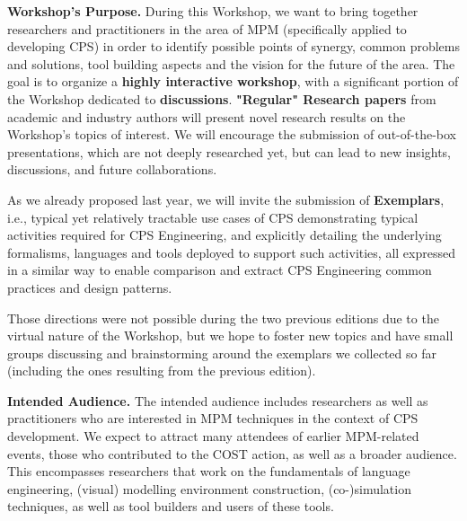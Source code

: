\smallskip\noindent
\textbf{Workshop's Purpose.} During this Workshop, we want to bring together 
researchers and practitioners in the area of MPM (specifically applied to 
developing CPS) in order to identify possible points of synergy, common problems
and solutions, tool building aspects and the vision for the future of the area.
The goal is to organize a \textbf{highly interactive workshop}, with a significant 
portion of the Workshop dedicated to \textbf{discussions}.
\textbf{"Regular" Research papers} from academic and industry authors 
   will present novel research results on the Workshop's topics of interest. 
   We will encourage the submission of out-of-the-box presentations, which are 
   not deeply researched yet, but can lead to new insights, discussions, and 
   future collaborations.

As we already proposed last year, we will invite the submission of 
   \textbf{Exemplars}, i.e., typical yet relatively tractable use cases of CPS 
   demonstrating typical activities required for CPS Engineering, and explicitly
   detailing the underlying formalisms, languages and tools deployed to support 
   such activities, all expressed in a similar way to enable comparison and 
   extract CPS Engineering common practices and design patterns.

Those directions were not possible during the two previous editions due to the
virtual nature of the Workshop, but we hope to foster new topics and have small
groups discussing and brainstorming around the exemplars we collected so far 
(including the ones resulting from the previous edition).



\smallskip
\noindent
\textbf{Intended Audience.}
%
The intended audience includes researchers as well as practitioners who are 
interested in MPM techniques in the context of CPS development.
We expect to attract many attendees of earlier MPM-related events, those who 
contributed to the COST action, as well as a broader audience.
This encompasses researchers that work on the fundamentals of language 
engineering, (visual) modelling environment construction, (co-)simulation 
techniques, as well as tool builders and users of these tools.



